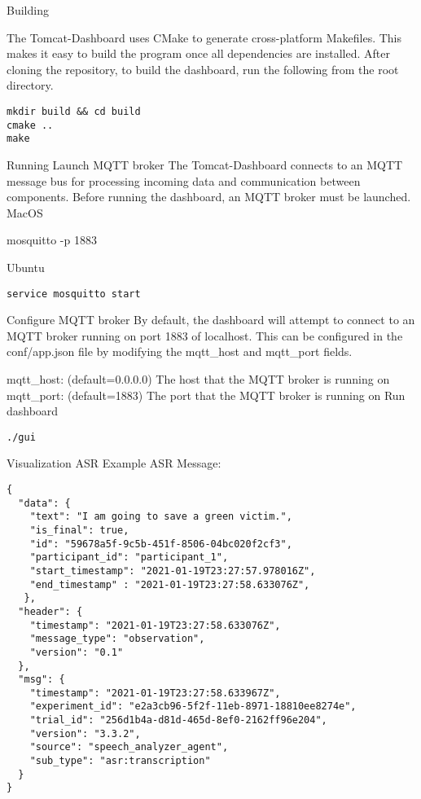 Building

The Tomcat-Dashboard uses CMake to generate cross-platform Makefiles. This
makes it easy to build the program once all dependencies are installed. After
cloning the repository, to build the dashboard, run the following from the root
directory.

\begin{verbatim}
mkdir build && cd build
cmake ..
make
\end{verbatim}


Running
Launch MQTT broker
The Tomcat-Dashboard connects to an MQTT message bus for processing incoming data and communication between components. Before running the dashboard, an MQTT broker must be launched.
MacOS

mosquitto -p 1883

Ubuntu

\begin{verbatim}
service mosquitto start
\end{verbatim}

Configure MQTT broker
By default, the dashboard will attempt to connect to an MQTT broker running on
port 1883 of localhost. This can be configured in the conf/app.json file by
modifying the mqtt\_host and mqtt\_port fields.

mqtt\_host: (default=0.0.0.0) The host that the MQTT broker is running on
mqtt\_port: (default=1883) The port that the MQTT broker is running on
Run dashboard

\begin{verbatim}
./gui
\end{verbatim}



Visualization
ASR
Example ASR Message:

\begin{verbatim}
{
  "data": {
    "text": "I am going to save a green victim.",
    "is_final": true,
    "id": "59678a5f-9c5b-451f-8506-04bc020f2cf3",
    "participant_id": "participant_1",
    "start_timestamp": "2021-01-19T23:27:57.978016Z",
    "end_timestamp" : "2021-01-19T23:27:58.633076Z",
   },
  "header": {
    "timestamp": "2021-01-19T23:27:58.633076Z",
    "message_type": "observation",
    "version": "0.1"
  },
  "msg": {
    "timestamp": "2021-01-19T23:27:58.633967Z",
    "experiment_id": "e2a3cb96-5f2f-11eb-8971-18810ee8274e",
    "trial_id": "256d1b4a-d81d-465d-8ef0-2162ff96e204",
    "version": "3.3.2",
    "source": "speech_analyzer_agent",
    "sub_type": "asr:transcription"
  }
}
\end{verbatim}


